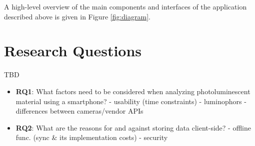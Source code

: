\documentclass[thesis.tex]{subfiles}
\begin{document}
A high-level overview of the main components and interfaces of the application described above is given in Figure \ref{fig:diagram}.

\section{Research Questions}

TBD

\begin{itemize}
	\item \textbf{RQ1}: What factors need to be considered when analyzing photoluminescent material using a smartphone?
	- usability (time constraints)
	- luminophors
	- differences between cameras/vendor APIs
	\item \textbf{RQ2}: What are the reasons for and against storing data client-side?
	- offline func. (sync \& its implementation costs)
	- security
\end{itemize}
\end{document}
